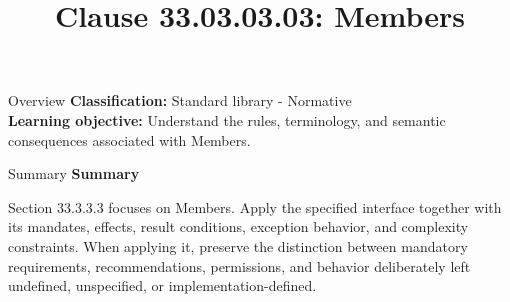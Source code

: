 \documentclass[10pt,letterpaper]{article}
\title{Clause 33.03.03.03: Members}
\author{}
\date{}
\begin{document}
\maketitle
\begin{CornellOverviewBox}{Overview}
\textbf{Classification:} Standard library - Normative\\[2pt]
\textbf{Learning objective:} Understand the rules, terminology, and semantic consequences associated with Members.
\end{CornellOverviewBox}\begin{CornellSummaryBox}{Summary}
{\sffamily\bfseries\color{Accent} Summary}\par\vspace{3pt}Section 33.3.3.3 focuses on Members. Apply the specified interface together with its mandates, effects, result conditions, exception behavior, and complexity constraints. When applying it, preserve the distinction between mandatory requirements, recommendations, permissions, and behavior deliberately left undefined, unspecified, or implementation-defined.
\end{CornellSummaryBox}
\end{document}
